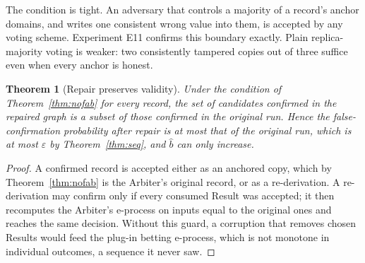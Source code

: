 \documentclass[11pt]{article}
\newtheorem{theorem}{Theorem}
\theoremstyle{definition}
\newcommand{\bhat}{\hat b}
\begin{document}
The condition is tight. An adversary that controls a majority of a record's anchor domains, and writes one consistent wrong value into them, is accepted by any voting scheme. Experiment E11 confirms this boundary exactly. Plain replica-majority voting is weaker: two consistently tampered copies out of three suffice even when every anchor is honest.

\begin{theorem}[Repair preserves validity]\label{thm:repair}
Under the condition of Theorem~\ref{thm:nofab} for every record, the set of candidates confirmed in the repaired graph is a subset of those confirmed in the original run. Hence the false-confirmation probability after repair is at most that of the original run, which is at most $\varepsilon$ by Theorem~\ref{thm:seq}, and $\bhat$ can only increase.
\end{theorem}
\begin{proof}
A confirmed record is accepted either as an anchored copy, which by Theorem~\ref{thm:nofab} is the Arbiter's original record, or as a re-derivation. A re-derivation may confirm only if every consumed Result was accepted; it then recomputes the Arbiter's e-process on inputs equal to the original ones and reaches the same decision. Without this guard, a corruption that removes chosen Results would feed the plug-in betting e-process, which is not monotone in individual outcomes, a sequence it never saw.
\end{proof}
\end{document}

